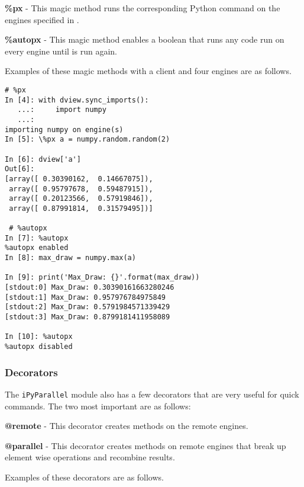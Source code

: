 \begin{list}{}{}
\item \textbf{\%px} - This magic method runs the corresponding Python command on the engines specified in .
\item \textbf{\%autopx} - This magic method enables a boolean that runs any code run on every engine until  is run again.
\end{list}

Examples of these magic methods with a client and four engines are as follows.

\begin{lstlisting}
# %px
In [4]: with dview.sync_imports():
   ...:     import numpy
   ...:
importing numpy on engine(s)
In [5]: \%px a = numpy.random.random(2)

In [6]: dview['a']
Out[6]:
[array([ 0.30390162,  0.14667075]),
 array([ 0.95797678,  0.59487915]),
 array([ 0.20123566,  0.57919846]),
 array([ 0.87991814,  0.31579495])]

 # %autopx
In [7]: %autopx
%autopx enabled
In [8]: max_draw = numpy.max(a)

In [9]: print('Max_Draw: {}'.format(max_draw))
[stdout:0] Max_Draw: 0.30390161663280246
[stdout:1] Max_Draw: 0.957976784975849
[stdout:2] Max_Draw: 0.5791984571339429
[stdout:3] Max_Draw: 0.8799181411958089

In [10]: %autopx
%autopx disabled
\end{lstlisting}
\subsubsection*{Decorators}
The \texttt{iPyParallel} module also has a few decorators that are very useful for quick commands.
The two most important are as follows:

\begin{list}{}{}
\item \textbf{@remote} - This decorator creates methods on the remote engines.
\item \textbf{@parallel} - This decorator creates methods on remote engines that break up element wise operations and recombine results.
\end{list}

Examples of these decorators are as follows.

